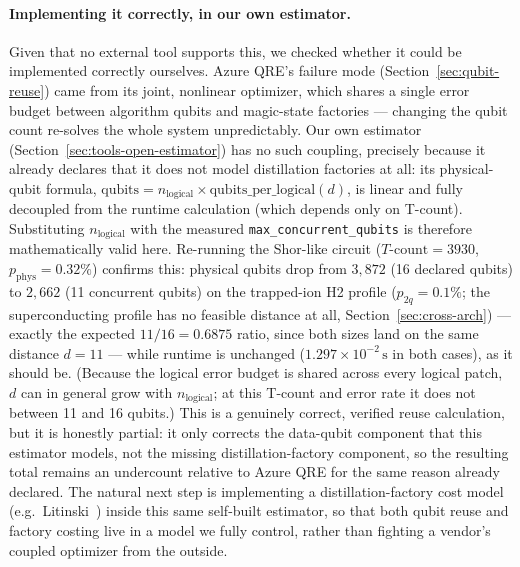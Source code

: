 \documentclass[9pt,twocolumn]{extarticle}
\begin{document}
\paragraph{Implementing it correctly, in our own estimator.} Given that no
external tool supports this, we checked whether it could be implemented
correctly ourselves. Azure QRE's failure mode (Section~\ref{sec:qubit-reuse})
came from its joint, nonlinear optimizer, which shares a single error
budget between algorithm qubits and magic-state factories --- changing the
qubit count re-solves the whole system unpredictably. Our own estimator
(Section~\ref{sec:tools-open-estimator}) has no such coupling, precisely
because it already declares that it does not model distillation factories
at all: its physical-qubit formula,
$\text{qubits} = n_{\text{logical}} \times \text{qubits\_per\_logical}(d)$,
is linear and fully decoupled from the runtime calculation (which depends
only on T-count). Substituting $n_{\text{logical}}$ with the measured
\texttt{max\_concurrent\_qubits} is therefore mathematically valid here.
Re-running the Shor-like circuit ($T\text{-count}=3930$,
$p_{\mathrm{phys}}=0.32\%$) confirms this: physical qubits drop from
$3{,}872$ (16 declared qubits) to $2{,}662$ (11 concurrent qubits) on the
trapped-ion H2 profile ($p_{2q}=0.1\%$; the superconducting profile has no
feasible distance at all, Section~\ref{sec:cross-arch}) ---
exactly the expected $11/16=0.6875$ ratio, since both sizes land on the
same distance $d=11$ --- while runtime is unchanged
($1.297\times10^{-2}\,\mathrm{s}$ in both cases), as it should be. (Because
the logical error budget is shared across every logical patch, $d$ can in
general grow with $n_{\text{logical}}$; at this T-count and error rate it
does not between 11 and 16 qubits.) This is
a genuinely correct, verified reuse calculation, but it is honestly
partial: it only corrects the data-qubit component that this estimator
models, not the missing distillation-factory component, so the resulting
total remains an undercount relative to Azure QRE for the same reason
already declared. The natural next step is implementing a distillation-factory
cost model (e.g.\ Litinski~\cite{litinski2019game}) inside this same
self-built estimator, so that both qubit reuse and factory costing live in
a model we fully control, rather than fighting a vendor's coupled
optimizer from the outside.
\end{document}
